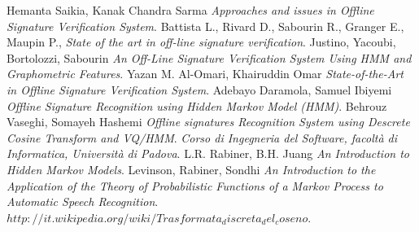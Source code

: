 \label{4.3}
\newpage

\printglossaries
{}
\label{5.0}

\newpage
\begin{thebibliography}{1}
 Hemanta Saikia, Kanak Chandra Sarma {\em Approaches and issues in Offline Signature Verification System}.
 Battista L., Rivard D., Sabourin R., Granger E., Maupin P., {\em State of the art in off-line signature verification}.
 Justino, Yacoubi, Bortolozzi, Sabourin {\em An Off-Line Signature Verification System Using HMM and Graphometric Features}.
 Yazan M. Al-Omari, Khairuddin Omar {\em State-of-the-Art in Offline Signature Verification System}.
 Adebayo Daramola, Samuel Ibiyemi {\em Offline Signature Recognition using Hidden Markov Model (HMM)}.
 Behrouz Vaseghi, Somayeh Hashemi {\em Offline signatures Recognition System using Descrete Cosine Transform and VQ/HMM}.
 {\em Corso di Ingegneria del Software, facoltà di Informatica, Università di Padova}.
 L.R. Rabiner, B.H. Juang {\em An Introduction to Hidden Markov Models}.
 Levinson, Rabiner, Sondhi {\em An Introduction to the Application of the Theory of Probabilistic Functions of a Markov Process to Automatic Speech Recognition}.
 {\em $http://it.wikipedia.org/wiki/Trasformata_discreta_del_coseno$}.
\end{thebibliography}
\label{6.0}

\newpage





